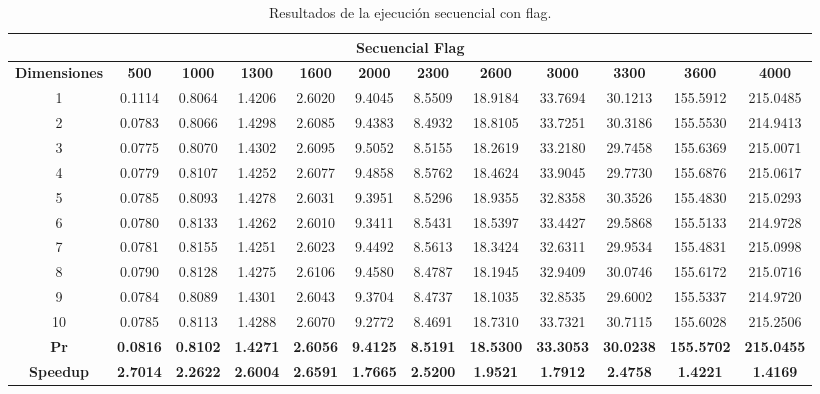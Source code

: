 \documentclass{article}
\begin{document}
\begin{table}[H]
\centering
\tiny
\begin{tabular}{|c|c|c|c|c|c|c|c|c|c|c|c|}
\hline
\multicolumn{12}{|c|}{\textbf{Secuencial Flag}} \\
\hline
\textbf{Dimensiones} & \textbf{500} & \textbf{1000} & \textbf{1300} & \textbf{1600} & \textbf{2000} & \textbf{2300} & \textbf{2600} & \textbf{3000} & \textbf{3300} & \textbf{3600} & \textbf{4000} \\
\hline
1  & 0.1114 & 0.8064 & 1.4206 & 2.6020 & 9.4045 & 8.5509 & 18.9184 & 33.7694 & 30.1213 & 155.5912 & 215.0485 \\
2  & 0.0783 & 0.8066 & 1.4298 & 2.6085 & 9.4383 & 8.4932 & 18.8105 & 33.7251 & 30.3186 & 155.5530 & 214.9413 \\
3  & 0.0775 & 0.8070 & 1.4302 & 2.6095 & 9.5052 & 8.5155 & 18.2619 & 33.2180 & 29.7458 & 155.6369 & 215.0071 \\
4  & 0.0779 & 0.8107 & 1.4252 & 2.6077 & 9.4858 & 8.5762 & 18.4624 & 33.9045 & 29.7730 & 155.6876 & 215.0617 \\
5  & 0.0785 & 0.8093 & 1.4278 & 2.6031 & 9.3951 & 8.5296 & 18.9355 & 32.8358 & 30.3526 & 155.4830 & 215.0293 \\
6  & 0.0780 & 0.8133 & 1.4262 & 2.6010 & 9.3411 & 8.5431 & 18.5397 & 33.4427 & 29.5868 & 155.5133 & 214.9728 \\
7  & 0.0781 & 0.8155 & 1.4251 & 2.6023 & 9.4492 & 8.5613 & 18.3424 & 32.6311 & 29.9534 & 155.4831 & 215.0998 \\
8  & 0.0790 & 0.8128 & 1.4275 & 2.6106 & 9.4580 & 8.4787 & 18.1945 & 32.9409 & 30.0746 & 155.6172 & 215.0716 \\
9  & 0.0784 & 0.8089 & 1.4301 & 2.6043 & 9.3704 & 8.4737 & 18.1035 & 32.8535 & 29.6002 & 155.5337 & 214.9720 \\
10 & 0.0785 & 0.8113 & 1.4288 & 2.6070 & 9.2772 & 8.4691 & 18.7310 & 33.7321 & 30.7115 & 155.6028 & 215.2506 \\
\hline
\textbf{Pr} & \textbf{0.0816} & \textbf{0.8102} & \textbf{1.4271} & \textbf{2.6056} & \textbf{9.4125} & \textbf{8.5191} & \textbf{18.5300} & \textbf{33.3053} & \textbf{30.0238} & \textbf{155.5702} & \textbf{215.0455} \\
\hline
\textbf{Speedup} & \textbf{2.7014} & \textbf{2.2622} & \textbf{2.6004} & \textbf{2.6591} & \textbf{1.7665} & \textbf{2.5200} & \textbf{1.9521} & \textbf{1.7912} & \textbf{2.4758} & \textbf{1.4221} & \textbf{1.4169} \\
\hline
\end{tabular}
\caption{Resultados de la ejecución secuencial con flag.}
\label{tab:secuencial_flag}
\end{table}
\end{document}
